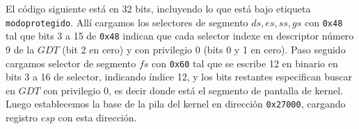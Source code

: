 El código siguiente está en 32 bits, incluyendo lo que está bajo etiqueta \verb|modoprotegido|. Allí cargamos los selectores de segmento $ds, es, ss, gs$ con \verb|0x48| tal que bits 3 a 15 de \verb|0x48| indican que cada selector indexe en descriptor número 9 de la $GDT$ (bit 2 en cero) y con privilegio 0 (bits 0 y 1 en cero). Paso seguido cargamos selector de segmento $fs$ con \verb|0x60| tal que se escribe 12 en binario en bits 3 a 16 de selector, indicando índice 12, y los bits restantes especifican buscar en $GDT$ con privilegio 0, es decir donde está el segmento de pantalla de kernel. Luego establecemos la base de la pila del kernel en dirección \verb|0x27000|, cargando registro $esp$ con esta dirección.


